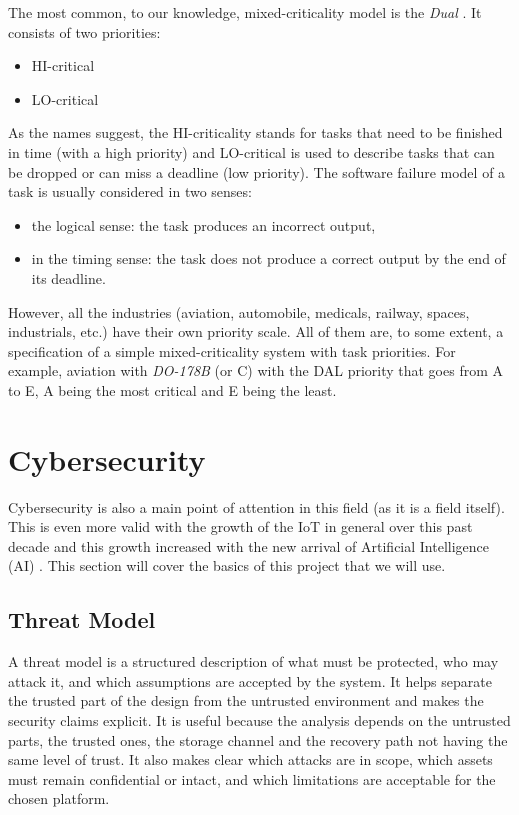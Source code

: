 \documentclass[11pt,a4paper]{report}
\begin{document}
The most common, to our knowledge, mixed-criticality model is the \textit{Dual} \cite{scheduling-mixed}. 
It consists of two priorities:
\begin{itemize}
    \item HI-critical
    \item LO-critical
\end{itemize} 
As the names suggest, the HI-criticality stands for tasks that need to be finished in time (with a high priority) and LO-critical is used to describe tasks that can be dropped or can miss a deadline (low priority).
The software failure model of a task is usually considered in two senses: 
\begin{itemize}
    \item the logical sense: the task produces an incorrect output,
    \item in the timing sense: the task does not produce a correct output by the end of its deadline.
\end{itemize}
However, all the industries (aviation, automobile, medicals, railway, spaces, industrials, etc.) have their own priority scale. All of them are, to some extent, a specification of a simple mixed-criticality system with task priorities. 
For example, aviation with \textit{DO-178B} (or C) with the DAL priority that goes from A to E, A being the most critical and E being the least. 


\section{Cybersecurity}
Cybersecurity is also a main point of attention in this field (as it is a field itself). 
This is even more valid with the growth of the IoT in general over this past decade and this growth increased with the new arrival of Artificial Intelligence (AI) \cite{iot}.
This section will cover the basics of this project that we will use.

\subsection{Threat Model}
A threat model is a structured description of what must be protected, who may attack it, and which assumptions are accepted by the system.
It helps separate the trusted part of the design from the untrusted environment and makes the security claims explicit.
It is useful because the analysis depends on the untrusted parts, the trusted ones, the storage channel and the recovery path not having the same level of trust.
It also makes clear which attacks are in scope, which assets must remain confidential or intact, and which limitations are acceptable for the chosen platform.
\\
\end{document}
